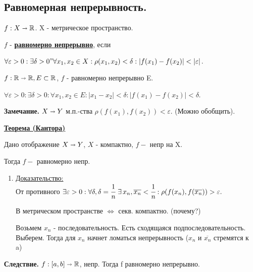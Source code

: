 \documentclass{article}
\newcommand{\deff}[1]{\underline{\textbf{#1}}}
\newcommand{\thmm}[1]{\underline{\textbf{#1}}}
\newcommand{\prooff}[1]{{\underline{Доказательство:}} \\ }
\begin{document}
\pagebreak
\subsection{Равномерная непрерывность.}

$f: X \shortrightarrow \mathbb{R}$. X - метрическое пространство. 

$f$ - \deff{равномерно непрерывно}, если

$\forall \varepsilon > 0: \exists \delta >0" \forall x_1,x_2 \in X: \rho(x_1,x_2)<\delta: |f(x_1)-f(x_2)|<|\varepsilon|$.

$f: \mathbb{R}\shortrightarrow \mathbb{R}, E\subset \mathbb{R}$, $f$ - равномерно непрерывно E.

$\forall \varepsilon >0: \exists \delta>0: \forall x_1,x_2 \in E: |x_1-x_2|<\delta: |f(x_1)-f(x_2)|< \delta$.

\textbf{Замечание.} $X \shortrightarrow Y$ м.п.-ства $\rho(f(x_1),f(x_2))<\varepsilon$. (Можно обобщить).

\thmm{Теорема (Кантора)}

Дано отображение $X \shortrightarrow Y$, $X$ - компактно, $f -$ непр на X.

Тогда $f -$ равномерно непр.

\begin{enumerate}
    \item[] \prooff{}
    От противного
   $\exists \varepsilon > 0: \forall \delta, \delta = \cfrac{1}{n}\,\, \exists \,x_n, \overline{x_n}<\cfrac{1}{n}: \rho(f(x_n),f(\overline{x_n}))>\varepsilon.$

   В метрическом пространстве $\Leftrightarrow$ секв. компактно. (почему?)

   Возьмем $x_n$ - последовательность. Есть сходящаяся подпоследовательность. Выберем. Тогда для $x_n$ начнет ломаться непрерывность ($x_n $ и $\overline{x_n}$ стремятся к a)
\end{enumerate}

\textbf{Следствие.} $f:[a,b] \shortrightarrow \mathbb{R}$, непр. Тогда f равномерно непрерывно.
\end{document}
